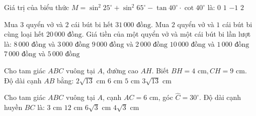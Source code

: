 \documentclass[12pt,a4paper]{article}
\begin{document}
\begin{ex}
Giá trị của biểu thức $M = \sin^2 25^\circ + \sin^2 65^\circ - \tan 40^\circ \cdot \cot 40^\circ$ là:
\choice
{\True $0$}
{$1$}
{$-1$}
{$2$}
\end{ex}

\begin{ex}
Mua $3$ quyển vở và $2$ cái bút bi hết $31\,000\text{ đồng}$. Mua $2$ quyển vở và $1$ cái bút bi cùng loại hết $20\,000\text{ đồng}$. Giá tiền của một quyển vở và một cái bút bi lần lượt là:
\choice
{$8\,000\text{ đồng}$ và $3\,000\text{ đồng}$}
{\True $9\,000\text{ đồng}$ và $2\,000\text{ đồng}$}
{$10\,000\text{ đồng}$ và $1\,000\text{ đồng}$}
{$7\,000\text{ đồng}$ và $5\,000\text{ đồng}$}
\end{ex}

\begin{ex}
Cho tam giác $ABC$ vuông tại $A$, đường cao $AH$. Biết $BH = 4\text{ cm}, CH = 9\text{ cm}$. Độ dài cạnh $AB$ bằng:
\choice
{\True $2\sqrt{13}\text{ cm}$}
{$6\text{ cm}$}
{$5\text{ cm}$}
{$3\sqrt{13}\text{ cm}$}
\end{ex}

\begin{ex}
Cho tam giác $ABC$ vuông tại $A$, cạnh $AC = 6\text{ cm}$, góc $\widehat{C} = 30^\circ$. Độ dài cạnh huyền $BC$ là:
\choice
{$3\text{ cm}$}
{$12\text{ cm}$}
{$6\sqrt{3}\text{ cm}$}
{\True $4\sqrt{3}\text{ cm}$}
\end{ex}
\end{document}
